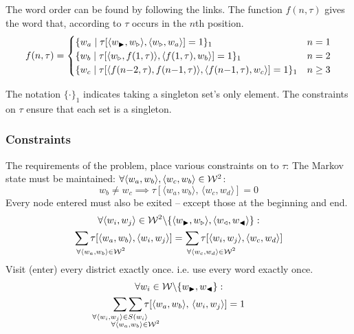 \documentclass[twocolumn]{article}
\begin{document}
The word order can be found by following the links. The function 
$f(n,\tau)$ gives the word that, according to $\tau$ occurs in the $n$th position.
\displayunskip
\begin{gather*}%
f(n,\tau)= %
\begin{cases}%
\{w_{a}\mid\tau[\langle\s,\ss\rangle,\langle\ss,w_{a}\rangle]=1\}_{1} & n=1\\%
\{w_{b}\mid\tau[\langle\ss,f(1,\tau)\rangle,\langle f(1,\tau),w_{b}\rangle]=1\}_{1} & n=2\\%
\{w_{c}\mid\tau[\langle f(n{-}2,\tau),f(n{-}1,\tau)\rangle,\langle f(n{-}1,\tau),w_{c}\rangle]=1\}_{1} & n\ge3%
\end{cases}%
\end{gather*}%

%
The notation $\{\cdot\}_{1}$ indicates taking a singleton set's only element.
The constraints on $\tau$ ensure that each set is a singleton.




\subsubsection{Constraints}
The requirements of the problem, place various constraints on to $\tau$:
%
The Markov state must be maintained: $\forall\langle w_{a},w_{b}\rangle,\langle w_{c},w_{b}\rangle\in\mathcal{W}^{2}$:
\begin{equation*}
w_{b}\ne w_{c} \implies \tau[\langle w_{a},w_{b}\rangle,\,\langle w_{c},w_{d}\rangle]=0
\end{equation*}
%
Every node entered must also be exited -- except those at the beginning and end.
\begin{multline*}
\forall\langle w_{i},w_{j}\rangle\in\W^{2}\backslash\{\langle\s,\ss\rangle,\langle\e,\ee\rangle\}: \\
 \sum_{\mathrlap{\!\!\!\!\forall\langle w_{a},w_{b}\rangle\in\W^{2}}}\tau[\langle w_{a},w_{b}\rangle,\langle w_{i},w_{j}\rangle]
=\sum_{\mathrlap{\!\!\!\!\forall\langle w_{c},w_{d}\rangle\in\W^{2}}}\tau[\langle w_{i},w_{j}\rangle,\langle w_{c},w_{d}\rangle]
\end{multline*}
%
Visit (enter) every district exactly once. i.e. use every word exactly once.
\displayunskip
\begin{multline*}
\forall w_{i}\in\W\backslash\{\s,\ee\}: \\
\sum_{\mathclap{\forall\langle w_{i},w_{j}\rangle\in S(w_{i}\rangle}}
\sum_{\mathclap{\substack{\; \\ \;\\ \forall\langle w_{a},w_{b}\rangle\in\W^{2}}}}
\tau[\langle w_{a},w_{b}\rangle,\,\langle w_{i},w_{j}\rangle]=1
\end{multline*}
\end{document}
